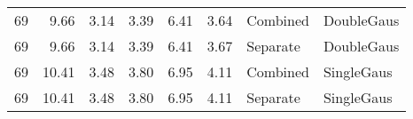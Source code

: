 \documentclass[11pt, letterpaper]{article}
\begin{document}
\begin{tabular}{lrrrrrll}
 69   &                        9.66 &               3.14 &                         3.39 &              6.41 &               3.64 & Combined & DoubleGaus \\
 69   &                        9.66 &               3.14 &                         3.39 &              6.41 &               3.67 & Separate & DoubleGaus \\
 69   &                       10.41 &               3.48 &                         3.80 &              6.95 &               4.11 & Combined & SingleGaus \\
 69   &                       10.41 &               3.48 &                         3.80 &              6.95 &               4.11 & Separate & SingleGaus \\
\hline
\end{tabular}
\end{document}
